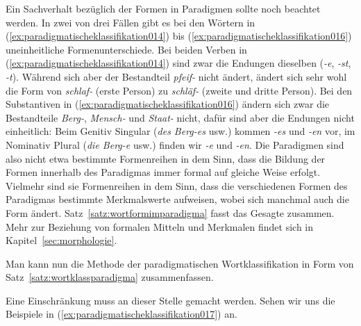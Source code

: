 Ein Sachverhalt bezüglich der Formen in Paradigmen sollte noch beachtet werden.
In zwei von drei Fällen gibt es bei den Wörtern in (\ref{ex:paradigmatischeklassifikation014}) bis (\ref{ex:paradigmatischeklassifikation016}) uneinheitliche Formenunterschiede.
Bei beiden Verben in (\ref{ex:paradigmatischeklassifikation014}) sind zwar die Endungen dieselben (\textit{-e}, \textit{-st}, \textit{-t}).
Während sich aber der Bestandteil \textit{pfeif-} nicht ändert, ändert sich sehr wohl die Form von \textit{schlaf-} (erste Person) zu \textit{schläf-} (zweite und dritte Person).
Bei den Substantiven in (\ref{ex:paradigmatischeklassifikation016}) ändern sich zwar die Bestandteile \textit{Berg-}, \textit{Mensch-} und \textit{Staat-} nicht, dafür sind aber die Endungen nicht einheitlich:
Beim Genitiv Singular (\textit{des Berg-es} usw.) kommen \textit{-es} und \textit{-en} vor, im Nominativ Plural (\textit{die Berg-e} usw.) finden wir \textit{-e} und \textit{-en}.
Die Paradigmen sind also nicht etwa bestimmte Formenreihen in dem Sinn, dass die Bildung der Formen innerhalb des Paradigmas immer formal auf gleiche Weise erfolgt.
Vielmehr sind sie Formenreihen in dem Sinn, dass die verschiedenen Formen des Paradigmas bestimmte Merkmalswerte aufweisen, wobei sich manchmal auch die Form ändert.
Satz~\ref{satz:wortformimparadigma} fasst das Gesagte zusammen.
Mehr zur Beziehung von formalen Mitteln und Merkmalen findet sich in Kapitel~\ref{sec:morphologie}.


Man kann nun die Methode der paradigmatischen Wortklassifikation in Form von Satz~\ref{satz:wortklassparadigma} zusammenfassen.



Eine Einschränkung muss an dieser Stelle gemacht werden.
Sehen wir uns die Beispiele in (\ref{ex:paradigmatischeklassifikation017}) an.

\begin{exe}
  \ex\label{ex:paradigmatischeklassifikation017}\begin{xlist}
  \end{xlist}
\end{exe}

